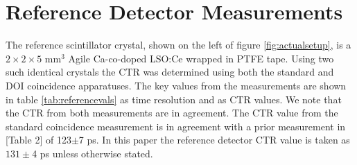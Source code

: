 \section{Reference Detector Measurements}
\label{sec:reference}
The reference scintillator crystal, shown on the left of figure \ref{fig:actualsetup}, is a $2\times2\times5$ mm$^3$ Agile Ca-co-doped LSO:Ce wrapped in PTFE tape. Using two such identical crystals the CTR was determined using both the standard and DOI coincidence apparatuses. The key values from the measurements are shown in table \ref{tab:referencevals} as time resolution and as CTR values. We note that the CTR from both measurements are in agreement. The CTR value from the standard coincidence measurement is in agreement with a prior measurement in [Table 2]\cite{uffray_Jarron_Meyer_Lecoq_2014} of 123$\pm$7 ps. In this paper the reference detector CTR value is taken as $131\pm$4 ps unless otherwise stated.
